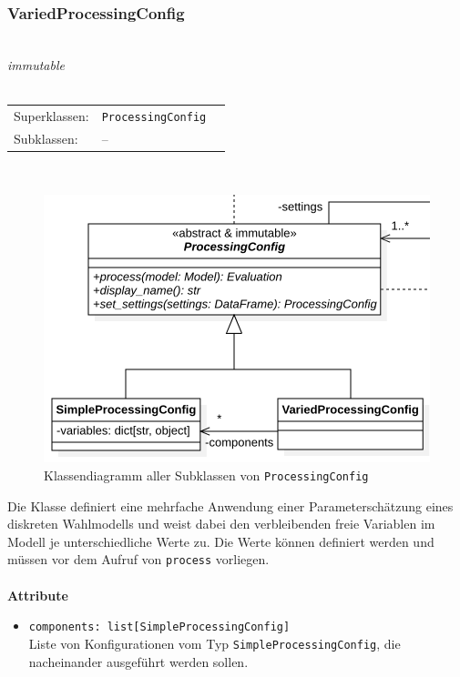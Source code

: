 \documentclass{article}
\begin{document}
\subsubsection*{\large{\textbf{VariedProcessingConfig}\label{cls:VariedProcessingConfig}}}\\
\textit{\flqq{}immutable\frqq}\normalsize\\\\
\begin{tabular}{lll}
 Superklassen: & \texttt{ProcessingConfig}\\
 Subklassen: & --
\end{tabular}\\
\begin{figure}[H]%
    \centering
    \includegraphics[width=13cm]{entwurf/Entwurf_dokument/img/cls/ProcessingConfigs.png}
    \caption{Klassendiagramm aller Subklassen von \texttt{ProcessingConfig}}
\end{figure}

Die Klasse definiert eine mehrfache Anwendung einer Parameterschätzung eines diskreten Wahlmodells und weist dabei den verbleibenden freie Variablen im Modell je unterschiedliche Werte zu. Die Werte können definiert werden und müssen vor dem Aufruf von \texttt{process} vorliegen.
\\\\

\textbf{{Attribute}}
\begin{itemize}\setlength\itemsep{3em}
\item \texttt{components: list[SimpleProcessingConfig]}\\
Liste von Konfigurationen vom Typ \texttt{SimpleProcessingConfig}, die nacheinander ausgeführt werden sollen.
\\\\
\end{itemize}
\end{document}
